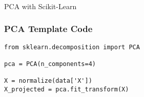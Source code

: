 \begin{frame}[fragile]\frametitle{}
\begin{center}
{\Large PCA with Scikit-Learn}
\end{center}
\end{frame}

\begin{frame}[fragile]
\frametitle{PCA Template Code}
\begin{lstlisting}
from sklearn.decomposition import PCA

pca = PCA(n_components=4)

X = normalize(data['X'])
X_projected = pca.fit_transform(X) 
\end{lstlisting}
\end{frame}













